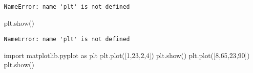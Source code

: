 \documentclass[
  spanish,
  12pt,
  letterpaper,
  DIV=11,
  numbers=noendperiod]{scrreprt}
\newenvironment{Shaded}{\begin{snugshade}}{\end{snugshade}}
\newcommand{\DecValTok}[1]{\textcolor[rgb]{0.68,0.00,0.00}{#1}}
\newcommand{\ImportTok}[1]{\textcolor[rgb]{0.00,0.46,0.62}{#1}}
\newcommand{\NormalTok}[1]{\textcolor[rgb]{0.00,0.23,0.31}{#1}}
\begin{document}
\begin{verbatim}
NameError: name 'plt' is not defined
\end{verbatim}

\begin{Shaded}
\begin{Highlighting}[]
\NormalTok{plt.show()}
\end{Highlighting}
\end{Shaded}

\begin{verbatim}
NameError: name 'plt' is not defined
\end{verbatim}

\begin{Shaded}
\begin{Highlighting}[]
\ImportTok{import}\NormalTok{ matplotlib.pyplot }\ImportTok{as}\NormalTok{ plt}
\NormalTok{plt.plot([}\DecValTok{1}\NormalTok{,}\DecValTok{23}\NormalTok{,}\DecValTok{2}\NormalTok{,}\DecValTok{4}\NormalTok{])}
\NormalTok{plt.show()}
\NormalTok{plt.plot([}\DecValTok{8}\NormalTok{,}\DecValTok{65}\NormalTok{,}\DecValTok{23}\NormalTok{,}\DecValTok{90}\NormalTok{])}
\NormalTok{plt.show()}
\end{Highlighting}
\end{Shaded}
\end{document}
